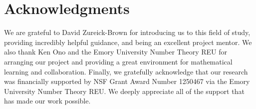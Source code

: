 \documentclass{amsart}
\theoremstyle{plain}
\theoremstyle{definition}
\theoremstyle{remark}
\numberwithin{equation}{section}
\begin{document}

\section{Acknowledgments}
We are grateful to David Zureick-Brown for introducing us to this
field of study, providing incredibly helpful guidance, and being an
excellent project mentor. We also thank Ken Ono and the Emory University
Number Theory REU for arranging our project and providing a great
environment for mathematical learning and collaboration. Finally, we
gratefully acknowledge that our research was financially supported by
NSF Grant Award Number 1250467 via the Emory University Number Theory REU.
We deeply appreciate all of the support that has made our work possible.


\nocite{*}
{}

\end{document}
